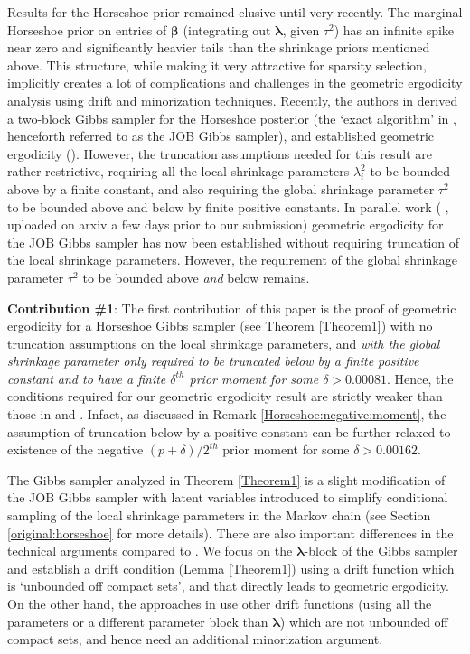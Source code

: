 \documentclass[noinfoline,11pt]{imsart}
\numberwithin{equation}{section}
\theoremstyle{plain}
\newcommand{\bb}{\boldsymbol{\beta}}
\newcommand{\bl}{\boldsymbol{\lambda}}
\newcommand\Myciteauthor[1]{\citeauthor{#1} \cite{#1}}
\begin{document}
Results for the Horseshoe prior remained elusive until very recently. The marginal Horseshoe prior on entries of $\bb$ (integrating out $\bl$, given $\tau^2$) has an infinite spike near zero and significantly heavier tails than the shrinkage priors mentioned above. This structure, while making it very attractive for sparsity selection, implicitly creates a lot of complications and challenges in the geometric ergodicity analysis using drift and minorization techniques. Recently, the authors 
in \Myciteauthor{johndrow2017bayes} derived a two-block Gibbs sampler for the Horseshoe posterior (the `exact algorithm' in \cite[Section 2.1]{johndrow2017bayes}, henceforth referred to as the JOB Gibbs sampler), and established geometric ergodicity 
(\cite[Theorem 14]{johndrow2017bayes}). However, the truncation assumptions needed for this result are rather restrictive, requiring all the local shrinkage parameters $\lambda_i^2$ to be bounded above by a finite constant, and also requiring the global shrinkage parameter $\tau^2$ to be bounded above and below by finite positive constants. In parallel work (\Myciteauthor{BBJJ:2020}, uploaded on arxiv a few days prior to our submission) geometric ergodicity for the JOB Gibbs sampler has now been established without requiring truncation of the local shrinkage parameters. However, the requirement of the global shrinkage parameter $\tau^2$ to be bounded above {\it and} below remains. 

{\bf Contribution \#1}: The first contribution of this paper is the proof of geometric ergodicity for a Horseshoe Gibbs sampler (see Theorem \ref{Theorem1}) with no truncation assumptions on the local shrinkage parameters, and {\it with the global shrinkage parameter only required to be truncated below by a finite positive constant and to have a finite $\delta^{th}$ prior moment for some $\delta > 0.00081$}. Hence, the 
conditions required for our geometric ergodicity result are strictly weaker than those in \cite{johndrow2017bayes} and \cite{BBJJ:2020}. Infact, as discussed in Remark \ref{Horseshoe:negative:moment}, the assumption of truncation below by a positive constant can be further relaxed to existence of the negative $(p+\delta)/2^{th}$ prior moment for some 
$\delta > 0.00162$. 

The Gibbs sampler analyzed in Theorem \ref{Theorem1} is a slight modification of the JOB Gibbs sampler with latent variables introduced to simplify conditional sampling of the local shrinkage parameters in the Markov chain (see Section \ref{original:horseshoe} for more details). There are also important differences in the technical arguments compared to \cite{johndrow2017bayes, BBJJ:2020}. We focus on the $\bl$-block of the Gibbs sampler and establish a drift condition (Lemma \ref{Theorem1}) using a drift function which is `unbounded off compact sets', and that directly leads to geometric ergodicity. On the other hand, the approaches in \cite{johndrow2017bayes, BBJJ:2020} use other drift functions (using all the parameters or a different parameter block than $\bl$) which are not unbounded off compact sets, and hence need an additional minorization argument. 
\end{document}
